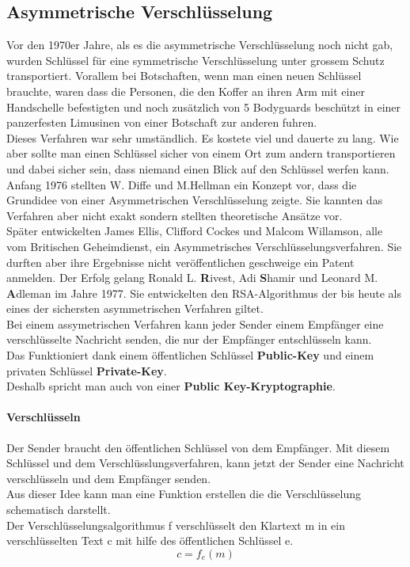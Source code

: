 \subsection{Asymmetrische Verschlüsselung}
Vor den 1970er Jahre, als es die asymmetrische Verschlüsselung noch nicht gab, wurden Schlüssel für eine symmetrische Verschlüsselung unter grossem Schutz transportiert.
Vorallem bei Botschaften, wenn man einen neuen Schlüssel brauchte, waren dass die Personen, die den Koffer an ihren Arm mit einer Handschelle befestigten und noch zusätzlich von 5 Bodyguards beschützt in einer panzerfesten Limusinen von einer Botschaft zur anderen fuhren.\\
Dieses Verfahren war sehr umständlich. Es kostete viel und dauerte zu lang. Wie aber sollte man einen Schlüssel sicher von einem Ort zum andern transportieren und dabei sicher sein, dass niemand einen Blick auf den Schlüssel werfen kann.\\
Anfang 1976 stellten W. Diffe und M.Hellman ein Konzept vor, dass die Grundidee von einer Asymmetrischen Verschlüsselung zeigte. Sie kannten das Verfahren aber nicht exakt sondern stellten theoretische Ansätze vor.\\ %
Später entwickelten James Ellis, Clifford Cockes und Malcom Willamson, alle vom Britischen Geheimdienst, ein Asymmetrisches Verschlüsselungsverfahren. Sie durften aber ihre Ergebnisse nicht veröffentlichen geschweige ein Patent anmelden. 
Der Erfolg gelang Ronald L. \textbf{R}ivest, Adi \textbf{S}hamir und Leonard M. \textbf{A}dleman im Jahre 1977. Sie entwickelten den RSA-Algorithmus der bis heute als eines der sichersten asymmetrischen Verfahren giltet.\\[2ex]
%
Bei einem assymetrischen Verfahren kann jeder Sender einem Empfänger eine verschlüsselte Nachricht senden, die nur der Empfänger entschlüsseln kann.\\
%
Das Funktioniert dank einem öffentlichen Schlüssel \textbf{Public-Key} und einem privaten Schlüssel \textbf{Private-Key}. \\
Deshalb spricht man auch von einer  \textbf{Public Key-Kryptographie}.
%
\paragraph{Verschlüsseln}
Der Sender braucht den öffentlichen Schlüssel von dem Empfänger. Mit diesem Schlüssel und dem Verschlüsslungsverfahren, kann jetzt der Sender eine Nachricht verschlüsseln und dem Empfänger senden.\\
Aus dieser Idee kann man eine Funktion erstellen die die Verschlüsselung schematisch darstellt.\\
Der Verschlüsselungsalgorithmus f verschlüsselt den Klartext m in ein verschlüsselten Text c mit hilfe des öffentlichen Schlüssel e.
\begin{equation*}
  c = f_e (m)
  \label{eqn:asy_versch}
\end{equation*}
